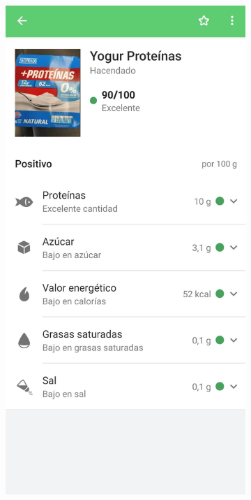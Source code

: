 \begin{figure}[h]
\begin{subfigure}{0.3\textwidth}
        \caption{}
        \label{fig:yuka-1}
    \end{subfigure}
    \begin{subfigure}{0.3\textwidth}
        \centering
        \includegraphics[width=0.9\linewidth]{Figures/Yuka-2.jpg}
        \caption{}
        \label{fig:yuka-2}
    \end{subfigure}
    \begin{subfigure}{0.3\textwidth}

\end{subfigure}
\end{figure}
